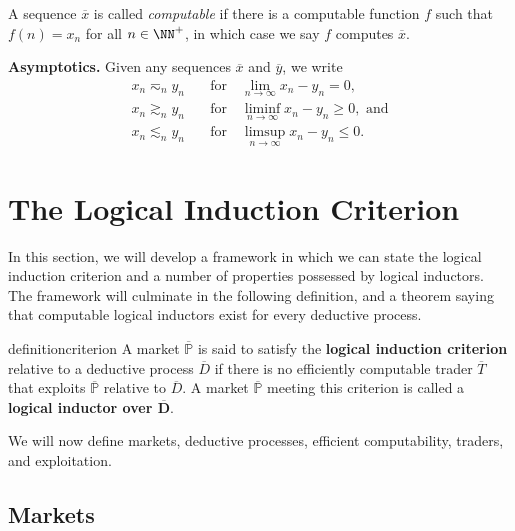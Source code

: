 \documentclass[authordate,onecolumn,noenvironments]{miri-tech-article}
\newenvironment{key}{\begin{mdframed}[innertopmargin=-.3\baselineskip]}{\end{mdframed}}
\numberwithin{equation}{subsection}
\newcommand{\seq}[1]{{\overline{#1}}}
\newcommand{\nn}{n}
\newcommand{\li}{logical inductor}
\newcommand{\lic}{logical induction criterion}
\newcommand{\LICtitle}{Logical Induction Criterion}
\newcommand{\tinysection}[1]{\medskip\noindent\textbf{#1.}}
\newcommand{\trade}{T}%
\newcommand{\Trader}{\seq{\trade}} %
\newcommand{\BelState}{\mathbb{P}}
\newcommand{\pt}{\BelState}
\newcommand{\MP}{\seq{\pt}}
\newcommand{\dt}{D}
\newcommand{\DP}{\seq{\dt}}
\begin{document}
A sequence $\seq{x}$ is called \emph{computable} if there is a computable function $f$ such that $f(\nn)=x_\nn$ for all $\nn\in {\NN^+}$, in which case we say $f$ computes $\seq{x}$.  

\tinysection{Asymptotics} Given any sequences $\seq x$ and $\seq y$, we write 
\begin{align*}
  x_\nn \eqsim_\nn y_\nn & \quad\text{for}\quad \lim_{n \to\infty} x_\nn - y_\nn = 0,\\
  x_\nn \gtrsim_\nn y_\nn & \quad\text{for}\quad \liminf_{n \to\infty} x_\nn - y_\nn \ge 0,\text{~and}\\
  x_\nn \lesssim_\nn y_\nn & \quad\text{for}\quad \limsup_{n \to\infty} x_\nn - y_\nn \le 0.
\end{align*}

%
%
%
%
%
%
%
%
%
%
%
%
%
%
%
%
%

\section{The \LICtitle}\label{sec:framework}\label{sec:criterion}
In this section, we will develop a framework in which we can state the logical induction criterion and a number of properties possessed by logical inductors. The framework will culminate in the following definition, and a theorem saying that computable logical inductors exist for every deductive process.

\begin{key}
\begin{restatable}{definition}{criterion}\label{def:lic}
  A market $\MP$ is said to satisfy the \textbf{\lic{}} relative to a deductive process $\DP$ if there is no efficiently computable trader $\Trader$ that exploits $\MP$ relative to $\DP$.  A market $\MP$ meeting this criterion is called a \textbf{\li{} over $\bm{\DP}$}.
\end{restatable}
\end{key}

\noindent We will now define markets, deductive processes, efficient computability, traders, and exploitation.



\subsection{Markets}\label{sec:valuations}
\end{document}
